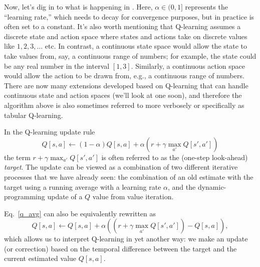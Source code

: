 Now, let's dig in to what is happening in .
Here, $\alpha\in (0,1]$ represents the ``learning rate,'' which needs to decay
for convergence purposes, but in practice is often set to a
constant. It's also worth mentioning that Q-learning assumes a
discrete state and action space where states and actions take on
discrete values like $1,2,3,\dots$ etc. In contrast, a continuous
state space would allow the state to take values from, say, a
continuous range of numbers; for example, the state could be any real
number in the interval $[1,3]$. Similarly, a continuous action space
would allow the action to be drawn from, e.g., a continuous range of
numbers. There are now many extensions developed based on Q-learning
that can handle continuous state and action spaces (we'll look at one
soon), and therefore the algorithm above is also sometimes referred to
more verbosely or specifically as tabular Q-learning.

In the Q-learning update rule
\begin{equation}\label{q_avg}
  Q[s, a] \leftarrow (1-\alpha)Q[s, a]
  + \alpha(r + \gamma \max_{a'}Q[s',a'])
\end{equation}
the term $r + \gamma \max_{a'} Q[s',a']$ is often referred to as the
(one-step look-ahead) \emph{target}. The update can be viewed as a
combination of two different iterative processes that we have already
seen: the combination of an old estimate with the target using a
running average with a learning rate $\alpha$, and the
dynamic-programming update of a $Q$ value from value iteration.


Eq.~\ref{q_avg} can also be equivalently rewritten as
\begin{equation}\label{td:q}
  Q[s, a] \leftarrow Q[s, a]
  + \alpha\left((r + \gamma \max_{a'}
  Q[s',a'])-Q[s,a]\right),
\end{equation}
which allows us to interpret Q-learning in yet another way: we make an
update (or correction) based on the temporal difference between the
target and the current estimated value $Q[s, a].$





